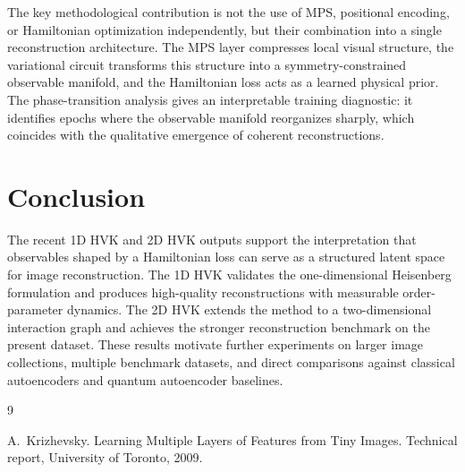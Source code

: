 \documentclass[11pt]{article}
\begin{document}
The key methodological contribution is not the use of MPS, positional encoding, or Hamiltonian optimization independently, but their combination into a single reconstruction architecture. The MPS layer compresses local visual structure, the variational circuit transforms this structure into a symmetry-constrained observable manifold, and the Hamiltonian loss acts as a learned physical prior. The phase-transition analysis gives an interpretable training diagnostic: it identifies epochs where the observable manifold reorganizes sharply, which coincides with the qualitative emergence of coherent reconstructions.

\section{Conclusion}

The recent 1D HVK and 2D HVK outputs support the interpretation that observables shaped by a Hamiltonian loss can serve as a structured latent space for image reconstruction. The 1D HVK validates the one-dimensional Heisenberg formulation and produces high-quality reconstructions with measurable order-parameter dynamics. The 2D HVK extends the method to a two-dimensional interaction graph and achieves the stronger reconstruction benchmark on the present dataset. These results motivate further experiments on larger image collections, multiple benchmark datasets, and direct comparisons against classical autoencoders and quantum autoencoder baselines.

\begin{thebibliography}{9}

A.~Krizhevsky.
\newblock Learning Multiple Layers of Features from Tiny Images.
\newblock Technical report, University of Toronto, 2009.

\end{thebibliography}
\end{document}
